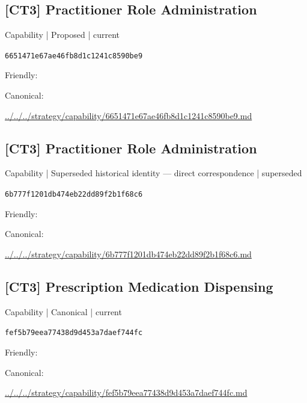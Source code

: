 \documentclass[10pt,a4paper]{article}
\begin{document}
\subsection*{[CT3] Practitioner Role Administration}
{\small Capability | Proposed | current}\par
\texttt{6651471e67ae46fb8d1c1241c8590be9}\par
Friendly: \par
Canonical: \par
{\footnotesize\url{../../../strategy/capability/6651471e67ae46fb8d1c1241c8590be9.md}}\par
\subsection*{[CT3] Practitioner Role Administration}
{\small Capability | Superseded historical identity — direct correspondence | superseded}\par
\texttt{6b777f1201db474eb22dd89f2b1f68c6}\par
Friendly: \par
Canonical: \par
{\footnotesize\url{../../../strategy/capability/6b777f1201db474eb22dd89f2b1f68c6.md}}\par
\subsection*{[CT3] Prescription Medication Dispensing}
{\small Capability | Canonical | current}\par
\texttt{fef5b79eea77438d9d453a7daef744fc}\par
Friendly: \par
Canonical: \par
{\footnotesize\url{../../../strategy/capability/fef5b79eea77438d9d453a7daef744fc.md}}\par
\end{document}
